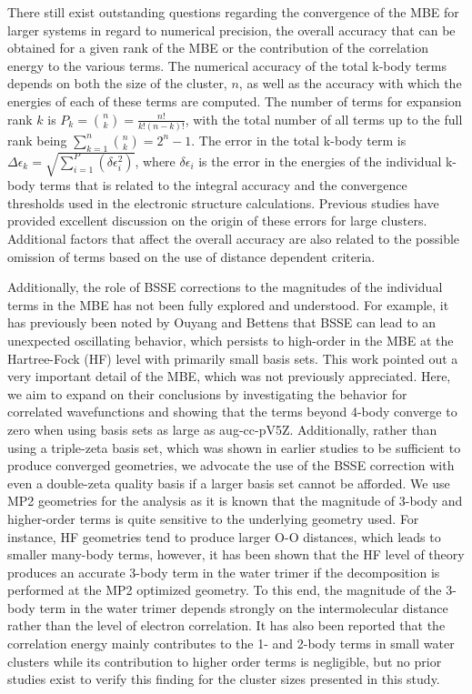 \documentclass[11pt, proquest]{uwthesis}[2020/02/24]
\begin{document}
\par There still exist outstanding questions regarding the convergence of the MBE for larger systems in regard to numerical precision, the overall accuracy that can be obtained for a given rank of the MBE\autocite{lao_understanding_2016, richard_understanding_2014} or the contribution of the correlation energy to the various terms. The numerical accuracy of the total k-body terms depends on both the size of the cluster, $n$, as well as the accuracy with which the energies of each of these terms are computed. The number of terms for expansion rank $k$ is $P_k=\binom{n}{k}=\frac{n!}{k!(n-k)!}$, with the total number of all terms up to the full rank being $\sum_{k=1}^{n}\binom{n}{k}=2^n-1$. The error in the total k-body term is $\Delta\epsilon_k=\sqrt{\sum_{i=1}^P(\delta\epsilon_i^2)}$, where $\delta\epsilon_i$ is the error in the energies of the individual k-body terms that is related to the integral accuracy and the convergence thresholds used in the electronic structure calculations. Previous studies have provided excellent discussion\autocite{lao_understanding_2016, richard_understanding_2014} on the origin of these errors for large clusters.  Additional factors that affect the overall accuracy are also related to the possible omission of terms based on the use of distance dependent criteria.
\par Additionally, the role of BSSE corrections to the magnitudes of the individual terms in the MBE has not been fully explored and understood. For example, it has previously been noted by Ouyang and Bettens that BSSE can lead to an unexpected oscillating behavior, which persists to high-order in the MBE at the Hartree-Fock (HF) level with primarily small basis sets.\autocite{ouyang_trouble_2014} This work pointed out a very important detail of the MBE, which was not previously appreciated. Here, we aim to expand on their conclusions by investigating the behavior for correlated wavefunctions and showing that the terms beyond 4-body converge to zero when using basis sets as large as aug-cc-pV5Z. Additionally, rather than using a triple-zeta basis set, which was shown in earlier studies to be sufficient to produce converged geometries,\autocite{xantheas_ab_1994, miliordos_optimal_2013} we advocate the use of the BSSE correction with even a double-zeta quality basis if a larger basis set cannot be afforded. We use MP2 geometries for the analysis as it is known that the magnitude of 3-body and higher-order terms is quite sensitive to the underlying geometry used. For instance, HF geometries tend to produce larger O-O distances,\autocite{miliordos_optimal_2013} which leads to smaller many-body terms, however, it has been shown that the HF level of theory produces an accurate 3-body term in the water trimer if the decomposition is performed at the MP2 optimized geometry.\autocite{klopper_ab_1995} To this end, the magnitude of the 3-body term in the water trimer depends strongly on the intermolecular distance rather than the level of electron correlation. It has also been reported that the correlation energy mainly contributes to the 1- and 2-body terms in small water clusters while its contribution to higher order terms is negligible,\autocite{dahlke_electrostatically_2007} but no prior studies exist to verify this finding for the cluster sizes presented in this study.
\end{document}
